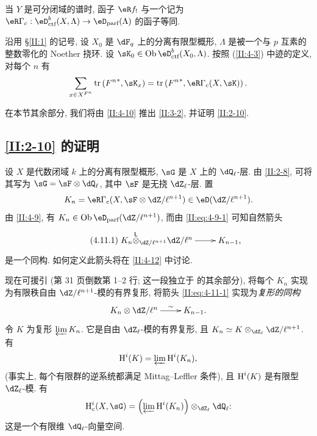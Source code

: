 当 $Y$ 是可分闭域的谱时, 函子 $\eR f_!$ 与一个记为 $\eR \Gamma_c : \eD_\text{ctf}^b(X,\Lambda)\to\eD_\text{parf}(\Lambda)$ 的函子等同.

\begin{theorem_}\label{II:4-10}
沿用 \S\ref{II:1} 的记号, 设 $X_0$ 是 $\dF_q$ 上的分离有限型概形, $\Lambda$ 是被一个与 $p$ 互素的整数零化的 Noether 挠环. 设 $\sK_0\in\ob\eD_\textnormal{ctf}^b(X_0,\Lambda)$. 按照 (\ref{II:4-3}) 中迹的定义, 对每个 $n$ 有
\begin{equation*}\label{II:eq:4-10}
  \sum_{x\in X^{F^n}} \tr\left({F^n}^*,\sK_x\right) = \tr\left({F^n}^*,\eR\Gamma_c(X,\sK)\right) \text{.}
\end{equation*}
\end{theorem_}

在本节其余部分, 我们将由 \ref{II:4-10} 推出 \ref{II:3-2}, 并证明 \ref{II:2-10}.

\subsection{\texorpdfstring{\ref{II:2-10}}{2.10} 的证明}\label{II:4-11}

设 $X$ 是代数闭域 $k$ 上的分离有限型概形, $\sG$ 是 $X$ 上的 $\dQ_\ell$-层. 由 \ref{II:2-8}, 可将其写为 $\sG=\sF\otimes\dQ_\ell$, 其中 $\sF$ 是无挠 $\dZ_\ell$-层. 置
\[
  K_n = \eR \Gamma_c(X,\sF\otimes\dZ/\ell^{n+1})\in\eD(\dZ/\ell^{n+1}) \text{.}
\]
由 \ref{II:4-9}, 有 $K_n\in\ob\eD_\text{parf}(\dZ/\ell^{n+1})$, 而由 \eqref{II:eq:4-9-1} 可知自然箭头
\begin{equation*}\tag{4.11.1}\label{II:eq:4-11-1}
\xymatrix{
  K_n\lotimes_{\dZ/\ell^{n+1}} \dZ/\ell^n \ar[r] & K_{n-1} \text{,}
}
\end{equation*}
是一个同构. 如何定义此箭头将在 \ref{II:4-12} 中讨论.

现在可援引 \cite[XV.3.3]{sga5} (第 31 页倒数第 1--2 行; 这一段独立于 \cite{sga5} 的其余部分), 将每个 $K_n$ 实现为有限秩自由 $\dZ/\ell^{n+1}$-模的有界复形, 将箭头 \eqref{II:eq:4-11-1} 实现为\emph{复形的同构}
\[\xymatrix{
  K_n\otimes \dZ/\ell^n \ar[r]^-\sim
    & K_{n-1} \text{.}
}\]
令 $K$ 为复形 $\varprojlim K_n$. 它是自由 $\dZ_\ell$-模的有界复形, 且 $K_n\simeq K\otimes_{\dZ_\ell}\dZ/\ell^{n+1}$. 有
\[
  \operatorname{H}^i(K) = \varprojlim \operatorname{H}^i(K_n) \text{,}
\]
(事实上, 每个有限群的逆系统都满足 Mittag--Leffler 条件), 且 $\operatorname{H}^i(K)$ 是有限型 $\dZ_\ell$-模. 有
\[
  \h_c^i(X,\sG) = \left(\varprojlim \h^i(K_n) \right)\otimes_{\dZ_\ell} \dQ_\ell \text{:}
\]
这是一个有限维 $\dQ_\ell$-向量空间.

